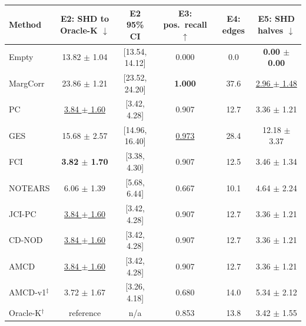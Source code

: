 \begin{tabular}{lccccc}
\toprule
Method & E2: SHD to Oracle-K $\downarrow$ & E2 95\% CI & E3: pos.\ recall $\uparrow$ & E4: edges & E5: SHD halves $\downarrow$ \\
\midrule
Empty & 13.82 $\pm$ 1.04 & [13.54, 14.12] & 0.000 & 0.0 & \textbf{0.00 $\pm$ 0.00} \\
MargCorr & 23.86 $\pm$ 1.21 & [23.52, 24.20] & \textbf{1.000} & 37.6 & \underline{2.96 $\pm$ 1.48} \\
PC & \underline{3.84 $\pm$ 1.60} & [3.42, 4.28] & 0.907 & 12.7 & 3.36 $\pm$ 1.21 \\
GES & 15.68 $\pm$ 2.57 & [14.96, 16.40] & \underline{0.973} & 28.4 & 12.18 $\pm$ 3.37 \\
FCI & \textbf{3.82 $\pm$ 1.70} & [3.38, 4.30] & 0.907 & 12.5 & 3.46 $\pm$ 1.34 \\
NOTEARS & 6.06 $\pm$ 1.39 & [5.68, 6.44] & 0.667 & 10.1 & 4.64 $\pm$ 2.24 \\
JCI-PC & \underline{3.84 $\pm$ 1.60} & [3.42, 4.28] & 0.907 & 12.7 & 3.36 $\pm$ 1.21 \\
CD-NOD & \underline{3.84 $\pm$ 1.60} & [3.42, 4.28] & 0.907 & 12.7 & 3.36 $\pm$ 1.21 \\
AMCD & \underline{3.84 $\pm$ 1.60} & [3.42, 4.28] & 0.907 & 12.7 & 3.36 $\pm$ 1.21 \\
AMCD-v1$^\ddagger$ & 3.72 $\pm$ 1.67 & [3.26, 4.18] & 0.680 & 14.0 & 5.34 $\pm$ 2.12 \\
Oracle-K$^\dagger$ & reference & n/a & 0.853 & 13.8 & 3.42 $\pm$ 1.55 \\
\bottomrule
\end{tabular}

